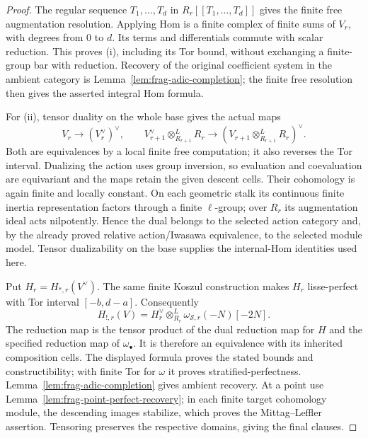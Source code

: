 \documentclass[11pt]{article}
\theoremstyle{definition}
\theoremstyle{remark}
\begin{document}
\begin{proof}
The regular sequence $T_1,\ldots,T_d$ in $R_r[[T_1,\ldots,T_d]]$
gives the finite free augmentation resolution.  Applying Hom is a
finite complex of finite sums of $V_r$, with degrees from $0$ to $d$.
Its terms and differentials commute with scalar reduction.  This
proves (i), including its Tor bound, without exchanging a finite-group
bar with reduction.  Recovery of the original coefficient system in
the ambient category is Lemma~\ref{lem:frag-adic-completion}; the
finite free resolution then gives the asserted integral Hom formula.

For (ii), tensor duality on the whole base gives the actual maps
\[
 V_r\longrightarrow(V_r^\vee)^\vee,\qquad
 V_{r+1}^\vee\otimes^L_{R_{r+1}}R_r
       \longrightarrow(V_{r+1}\otimes^L_{R_{r+1}}R_r)^\vee.
\]
Both are equivalences by a local finite free computation; it also
reverses the Tor interval.  Dualizing the action uses group inversion,
so evaluation and coevaluation are equivariant and the maps retain
the given descent cells.  Their cohomology is again finite and
locally constant.  On each geometric stalk its continuous finite
inertia representation factors through a finite $\ell$-group;
over $R_r$ its augmentation ideal acts nilpotently.  Hence the dual
belongs to the selected action category and, by the already proved
relative action/Iwasawa equivalence, to the selected module model.
Tensor dualizability on the base supplies the internal-Hom identities
used here.

Put $H_r=H_{*,r}(V^\vee)$.  The same finite Koszul construction makes
$H_r$ lisse-perfect with Tor interval $[-b,d-a]$.  Consequently
\[
 H_{!,r}(V)=H_r^\vee\otimes^L_{R_r}
                  \omega_{\mathscr S,r}(-N)[-2N].
\]
The reduction map is the tensor product of the dual reduction map
for $H$ and the specified reduction map of $\omega_\bullet$.
It is therefore an equivalence with its inherited composition cells.
The displayed formula proves the stated bounds and constructibility;
with finite Tor for $\omega$ it proves stratified-perfectness.
Lemma~\ref{lem:frag-adic-completion} gives ambient recovery.
At a point use Lemma~\ref{lem:frag-point-perfect-recovery}; in each
finite target cohomology module, the descending images stabilize,
which proves the Mittag--Leffler assertion.  Tensoring preserves the
respective domains, giving the final clauses.
\end{proof}
\end{document}
